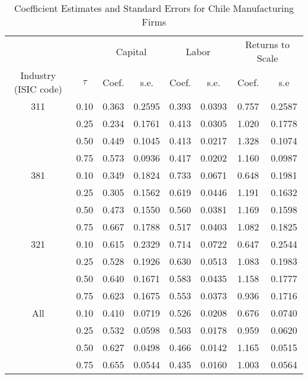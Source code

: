 \begin{table}[ht]
\centering
\caption{Coefficient Estimates and Standard Errors for Chile Manufacturing Firms} 
\begin{tabular}{cccccccc}
  \hline\hline & & \multicolumn{2}{c}{Capital}  & \multicolumn{2}{c}{Labor} & \multicolumn{2}{c}{Returns to Scale} \\ \cmidrule(lr){3-4} \cmidrule(lr){5-6} \cmidrule(lr){7-8}Industry (ISIC code) & $\tau$ & Coef. & s.e. & Coef. & s.e. & Coef. & s.e \\ 
  \hline
311 & 0.10 & 0.363 & 0.2595 & 0.393 & 0.0393 & 0.757 & 0.2587 \\ 
   & 0.25 & 0.234 & 0.1761 & 0.413 & 0.0305 & 1.020 & 0.1778 \\ 
   & 0.50 & 0.449 & 0.1045 & 0.413 & 0.0217 & 1.328 & 0.1074 \\ 
   & 0.75 & 0.573 & 0.0936 & 0.417 & 0.0202 & 1.160 & 0.0987 \\ 
  381 & 0.10 & 0.349 & 0.1824 & 0.733 & 0.0671 & 0.648 & 0.1981 \\ 
   & 0.25 & 0.305 & 0.1562 & 0.619 & 0.0446 & 1.191 & 0.1632 \\ 
   & 0.50 & 0.473 & 0.1550 & 0.560 & 0.0381 & 1.169 & 0.1598 \\ 
   & 0.75 & 0.667 & 0.1788 & 0.517 & 0.0403 & 1.082 & 0.1825 \\ 
  321 & 0.10 & 0.615 & 0.2329 & 0.714 & 0.0722 & 0.647 & 0.2544 \\ 
   & 0.25 & 0.528 & 0.1926 & 0.630 & 0.0513 & 1.083 & 0.1983 \\ 
   & 0.50 & 0.640 & 0.1671 & 0.583 & 0.0435 & 1.158 & 0.1777 \\ 
   & 0.75 & 0.623 & 0.1675 & 0.553 & 0.0373 & 0.936 & 0.1716 \\ 
  All & 0.10 & 0.410 & 0.0719 & 0.526 & 0.0208 & 0.676 & 0.0740 \\ 
   & 0.25 & 0.532 & 0.0598 & 0.503 & 0.0178 & 0.959 & 0.0620 \\ 
   & 0.50 & 0.627 & 0.0498 & 0.466 & 0.0142 & 1.165 & 0.0515 \\ 
   & 0.75 & 0.655 & 0.0544 & 0.435 & 0.0160 & 1.003 & 0.0564 \\ 
   \hline
\end{tabular}
\end{table}
